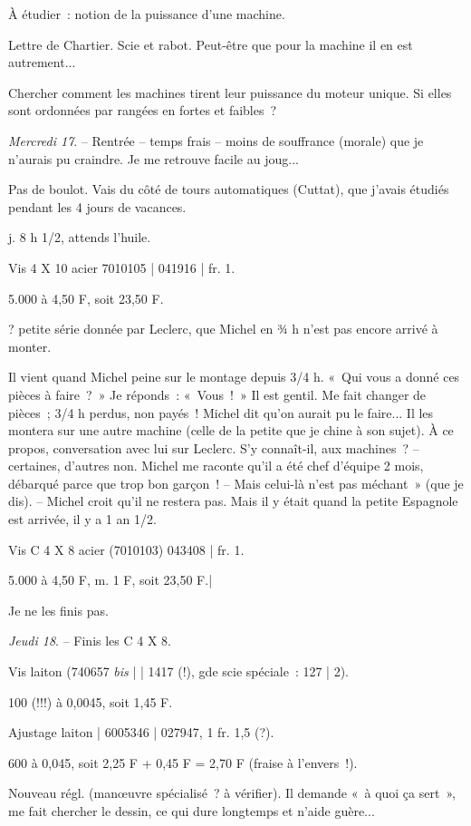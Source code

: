 \documentclass[french,twoside]{book} %
\begin{document}
À étudier : notion de la puissance d'une machine.\par
Lettre de Chartier. Scie et rabot. Peut-être que pour la machine il en est autrement...\par
Chercher comment les machines tirent leur puissance du moteur unique. Si elles sont ordonnées par rangées en fortes et faibles ?\par
\par
{\itshape Mercredi 17}. – Rentrée – temps frais – moins de souffrance (morale) que je n'aurais pu craindre. Je me retrouve facile au joug...\par
Pas de boulot. Vais du côté de tours automatiques (Cuttat), que j'avais étudiés pendant les 4 jours de vacances.\par
j. 8 h 1/2, attends l'huile.\par
Vis 4 X 10 acier 7010105 | 041916 | fr. 1.\par
5.000 à 4,50 F, soit 23,50 F.\par
? petite série donnée par Leclerc, que Michel en ¾ h n'est pas encore arrivé à monter.\par
Il vient quand Michel peine sur le montage depuis 3/4 h. « Qui vous a donné ces pièces à faire ? » Je réponds : « Vous ! » Il est gentil. Me fait changer de pièces ; 3/4 h perdus, non payés ! Michel dit qu'on aurait pu le faire... Il les montera sur une autre machine (celle de la petite que je chine à son sujet). À ce propos, conversation avec lui sur Leclerc. S'y connaît-il, aux machines ? – certaines, d'autres non. Michel me raconte qu'il a été chef d'équipe 2 mois, débarqué parce que trop bon garçon ! – Mais celui-là n'est pas méchant » (que je dis). – Michel croit qu'il ne restera pas. Mais il y était quand la petite Espagnole est arrivée, il y a 1 an 1/2.\par
Vis C 4 X 8 acier (7010103) 043408 | fr. 1.\par
5.000 à 4,50 F, m. 1 F, soit 23,50 F.|\par
Je ne les finis pas.\par
{\itshape Jeudi 18}. – Finis les C 4 X 8.\par
Vis laiton (740657 {\itshape bis} | | 1417 (!), gde scie spéciale : 127 | 2).\par
100 (!!!) à 0,0045, soit 1,45 F.\par
Ajustage laiton | 6005346 | 027947, 1 fr. 1,5 (?).\par
600 à 0,045, soit 2,25 F + 0,45 F = 2,70 F (fraise à l'envers !).\par
Nouveau régl. (manœuvre spécialisé ? à vérifier). Il demande « à quoi ça sert », me fait chercher le dessin, ce qui dure longtemps et n'aide guère...\par
\end{document}
